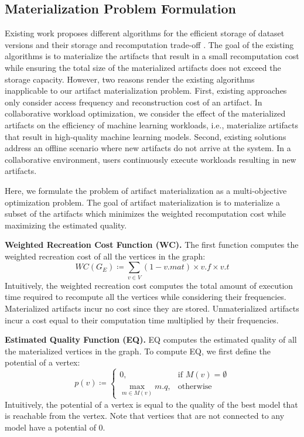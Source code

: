 \subsection{Materialization Problem Formulation}\label{subsec-materialization-problem}
Existing work proposes different algorithms for the efficient storage of dataset versions and their storage and recomputation trade-off \cite{bhattacherjee2015principles}.
The goal of the existing algorithms is to materialize the artifacts that result in a small recomputation cost while ensuring the total size of the materialized artifacts does not exceed the storage capacity.
However, two reasons render the existing algorithms inapplicable to our artifact materialization problem.
First, existing approaches only consider access frequency and reconstruction cost of an artifact.
In collaborative workload optimization, we consider the effect of the materialized artifacts on the efficiency of machine learning workloads, i.e., materialize artifacts that result in high-quality machine learning models.
Second, existing solutions address an offline scenario where new artifacts do not arrive at the system.
In a collaborative environment, users continuously execute workloads resulting in new artifacts.

Here, we formulate the problem of artifact materialization as a multi-objective optimization problem.
The goal of artifact materialization is to materialize a subset of the artifacts which minimizes the weighted recomputation cost while maximizing the estimated quality.

\textbf{Weighted Recreation Cost Function (WC).} 
The first function computes the weighted recreation cost of all the vertices in the graph:
\[
WC(G_E) \coloneqq  \sum\limits_{v \in V}  (1-v.mat) \times v.f \times v.t
\]
Intuitively, the weighted recreation cost computes the total amount of execution time required to recompute all the vertices while considering their frequencies.
Materialized artifacts incur no cost since they are stored.
Unmaterialized artifacts incur a cost equal to their computation time multiplied by their frequencies.

\textbf{Estimated Quality Function (EQ).} 
EQ computes the estimated quality of all the materialized vertices in the graph.
To compute EQ, we first define the potential of a vertex:
\[
p(v) \coloneqq  
		\begin{cases}
		0 , & \text{if }M(v) = \emptyset  \\
		\max\limits_{m \in M(v)} m.q, & \text{otherwise}
		\end{cases}
\]
Intuitively, the potential of a vertex is equal to the quality of the best model that is reachable from the vertex.
Note that vertices that are not connected to any model have a potential of 0.

